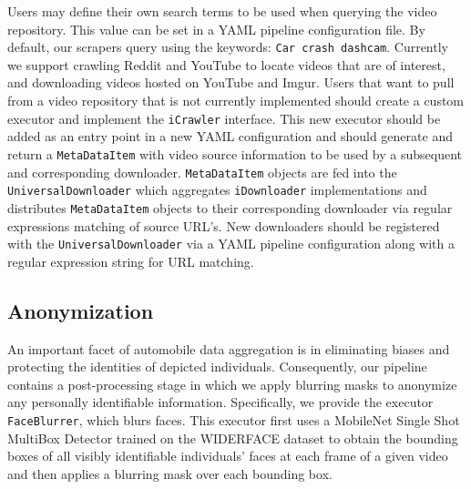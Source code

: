 \documentclass[letterpaper, 10 pt, conference]{IEEEconf}
\newcommand{\todo}[1]{{\color{red}#1}}
\begin{document}
Users may define their own search terms to be used when querying the video repository. This value can be set in a YAML pipeline configuration file. By default, our scrapers query using the keywords: \texttt{Car crash dashcam}. Currently we support crawling Reddit and YouTube to locate videos that are of interest, and downloading videos hosted on YouTube and Imgur. Users that want to pull from a video repository that is not currently implemented should create a custom executor and implement the \texttt{iCrawler} interface. This new executor should be added as an entry point in a new YAML configuration and should generate and return a \texttt{MetaDataItem} with video source information to be used by a subsequent and corresponding downloader. \texttt{MetaDataItem} objects are fed into the \texttt{UniversalDownloader} which aggregates \texttt{iDownloader} implementations and distributes \texttt{MetaDataItem} objects to their corresponding downloader via regular expressions matching of source URL's. New downloaders should be registered with the \texttt{UniversalDownloader} via a YAML pipeline configuration along with a regular expression string for URL matching.

\subsection{Anonymization}
An important facet of automobile data aggregation is in eliminating biases and protecting the identities of depicted individuals. Consequently, our pipeline contains a post-processing stage in which we apply blurring masks to anonymize any personally identifiable information. Specifically, we provide the executor \texttt{FaceBlurrer}, which blurs faces. This executor first uses a MobileNet Single Shot MultiBox Detector \cite{yixuan_h_y_hu_2021_4642275} trained on the WIDERFACE dataset \cite{yang2016wider} to obtain the bounding boxes of all visibly identifiable individuals' faces at each frame of a given video and then applies a blurring mask over each bounding box.
\end{document}
